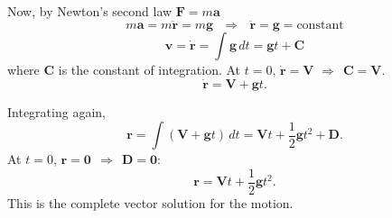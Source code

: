 Now, by Newton's second law $\boldsymbol{F} = m \boldsymbol{a}$
\begin{displaymath}
m \boldsymbol{a} = m \ddot{\boldsymbol{r}} = m \boldsymbol{g}
\ \ \ \Rightarrow \ \ \ 
\ddot{\boldsymbol{r}} = \boldsymbol{g} = \mathrm{constant}
\end{displaymath}
\begin{displaymath}
\boldsymbol{v} = \dot{\boldsymbol{r}} = \int \boldsymbol{g} \, dt = \boldsymbol{g} t + \boldsymbol{C}
\end{displaymath}
where $\boldsymbol{C}$ is the constant of integration.  At $t = 0$, $\dot{\boldsymbol{r}} = \boldsymbol{V}$
$\Rightarrow \ \ \boldsymbol{C} = \boldsymbol{V}$.
\begin{displaymath}
\dot{\boldsymbol{r}} = \boldsymbol{V} + \boldsymbol{g} t .
\end{displaymath}

Integrating again,
\begin{displaymath}
\boldsymbol{r} = \int ( \boldsymbol{V} + \boldsymbol{g} t ) \, dt
=
\boldsymbol{V} t + \frac{1}{2} \boldsymbol{g} t^2 + \boldsymbol{D} .
\end{displaymath}
At $t = 0$, $\boldsymbol{r} = \boldsymbol{0} \ \ \Rightarrow \ \ \boldsymbol{D} = \boldsymbol{0}$:
\begin{displaymath}
\boldsymbol{r} = \boldsymbol{V} t + \frac{1}{2} \boldsymbol{g} t^2 .
\end{displaymath}
This is the complete vector solution for the motion.

